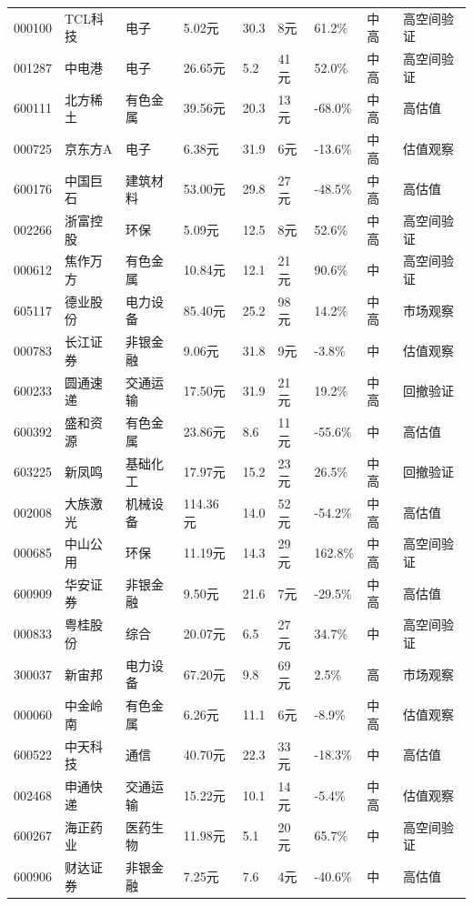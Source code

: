 \begin{longtable}{L{1.05cm}L{1.55cm}L{1.55cm}R{0.85cm}R{0.85cm}R{0.85cm}R{0.85cm}R{0.65cm}L{2.65cm}}
000100 & TCL科技 & 电子 & 5.02元 & 30.3 & 8元 & 61.2\% & 中高 & 高空间验证 \\
001287 & 中电港 & 电子 & 26.65元 & 5.2 & 41元 & 52.0\% & 中高 & 高空间验证 \\
600111 & 北方稀土 & 有色金属 & 39.56元 & 20.3 & 13元 & -68.0\% & 中高 & 高估值 \\
000725 & 京东方A & 电子 & 6.38元 & 31.9 & 6元 & -13.6\% & 中高 & 估值观察 \\
600176 & 中国巨石 & 建筑材料 & 53.00元 & 29.8 & 27元 & -48.5\% & 中高 & 高估值 \\
002266 & 浙富控股 & 环保 & 5.09元 & 12.5 & 8元 & 52.6\% & 中高 & 高空间验证 \\
000612 & 焦作万方 & 有色金属 & 10.84元 & 12.1 & 21元 & 90.6\% & 中 & 高空间验证 \\
605117 & 德业股份 & 电力设备 & 85.40元 & 25.2 & 98元 & 14.2\% & 中高 & 市场观察 \\
000783 & 长江证券 & 非银金融 & 9.06元 & 31.8 & 9元 & -3.8\% & 中 & 估值观察 \\
600233 & 圆通速递 & 交通运输 & 17.50元 & 31.9 & 21元 & 19.2\% & 中高 & 回撤验证 \\
600392 & 盛和资源 & 有色金属 & 23.86元 & 8.6 & 11元 & -55.6\% & 中 & 高估值 \\
603225 & 新凤鸣 & 基础化工 & 17.97元 & 15.2 & 23元 & 26.5\% & 中高 & 回撤验证 \\
002008 & 大族激光 & 机械设备 & 114.36元 & 14.0 & 52元 & -54.2\% & 中高 & 高估值 \\
000685 & 中山公用 & 环保 & 11.19元 & 14.3 & 29元 & 162.8\% & 中高 & 高空间验证 \\
600909 & 华安证券 & 非银金融 & 9.50元 & 21.6 & 7元 & -29.5\% & 中高 & 高估值 \\
000833 & 粤桂股份 & 综合 & 20.07元 & 6.5 & 27元 & 34.7\% & 中 & 高空间验证 \\
300037 & 新宙邦 & 电力设备 & 67.20元 & 9.8 & 69元 & 2.5\% & 高 & 市场观察 \\
000060 & 中金岭南 & 有色金属 & 6.26元 & 11.1 & 6元 & -8.9\% & 中高 & 估值观察 \\
600522 & 中天科技 & 通信 & 40.70元 & 22.3 & 33元 & -18.3\% & 中 & 高估值 \\
002468 & 申通快递 & 交通运输 & 15.22元 & 10.1 & 14元 & -5.4\% & 中高 & 估值观察 \\
600267 & 海正药业 & 医药生物 & 11.98元 & 5.1 & 20元 & 65.7\% & 中 & 高空间验证 \\
600906 & 财达证券 & 非银金融 & 7.25元 & 7.6 & 4元 & -40.6\% & 中 & 高估值 \\

\end{longtable}
